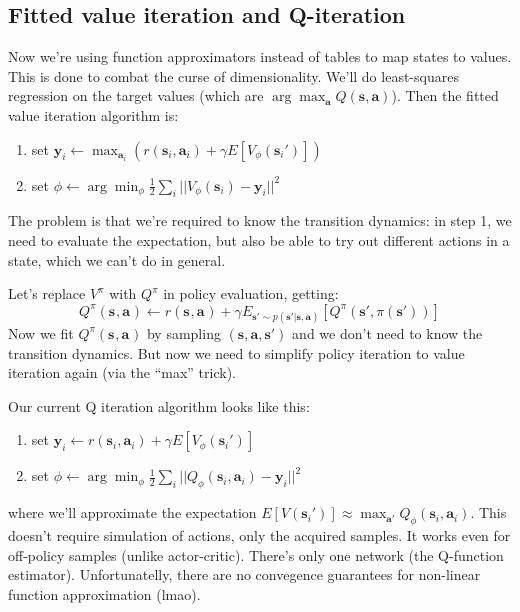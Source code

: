 \documentclass{report}
\newcommand{\argmin}{\arg\!\min}
\newcommand{\argmax}{\arg\!\max}
\begin{document}
\subsection{Fitted value iteration and Q-iteration}
Now we're using function approximators instead of tables to map states to values.
This is done to combat the curse of dimensionality.
We'll do least-squares regression on the target values (which are $\argmax_{\bm{a}} Q(\bm{s}, \bm{a})$).
Then the fitted value iteration algorithm is:
\begin{enumerate}
		\item set $ \bm{y}_i \leftarrow \max_{\bm{a}_i} \left( r (\bm{s}_{i}, \bm{a}_{i}) + \gamma E \left[ V_\phi (\bm{s}_i')  \right]  \right)     $ 
		\item set $ \phi \leftarrow \argmin_\phi \frac{1}{2} \sum_{i}^{} ||   V_\phi (\bm{s}_i)  - \bm{y}_i ||^2 $
\end{enumerate}
The problem is that we're required to know the transition dynamics:
in step 1, we need to evaluate the expectation, but also be able to try out different actions in a state, which we can't do in general.

Let's replace $V^\pi$ with $Q^\pi$ in policy evaluation, getting:
\begin{equation}
		Q^\pi (\bm{s}_{}, \bm{a}_{}) \leftarrow r(\bm{s}_{}, \bm{a}_{}) + 
		\gamma E_{\bm{s}' \sim p(\bm{s}'| \bm{s}, \bm{a})}
		\left[ Q^\pi(\bm{s}', \pi(\bm{s}')) \right] 
\end{equation}
Now we fit $ Q^\pi(\bm{s}_{}, \bm{a}_{}) $ by sampling $(\bm{s}, \bm{a}, \bm{s}')$
and we don't need to know the transition dynamics.
But now we need to simplify policy iteration to value iteration again (via the ``max'' trick).

Our current Q iteration algorithm looks like this:
\begin{enumerate}
		\item set $ \bm{y}_i \leftarrow r(\bm{s}_{i}, \bm{a}_{i}) + \gamma E \left[ V_\phi (\bm{s}_i') \right]      $
		\item set $  \phi \leftarrow \argmin_\phi \frac{1}{2} \sum_{i}^{} || Q_\phi (\bm{s}_{i}, \bm{a}_{i}) - \bm{y}_i||^2      $
\end{enumerate}
where we'll approximate the expectation $ E \left[ V(\bm{s}_i')  \right] \approx \max_{\bm{a}'} Q_\phi(\bm{s}_{i}, \bm{a}_{i})   $.
This doesn't require simulation of actions, only the acquired samples.
It works even for off-policy samples (unlike actor-critic).
There's only one network (the Q-function estimator).
Unfortunatelly, there are no convegence guarantees for non-linear function approximation (lmao).
\end{document}
